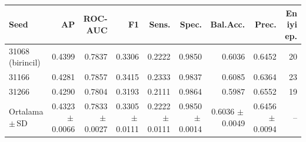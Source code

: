 \begin{tabular}{lrrrrrrrr}\toprule
Seed & AP & ROC-AUC & F1 & Sens. & Spec. & Bal.Acc. & Prec. & En iyi ep. \\\midrule
31068 (birincil) & 0.4399 & 0.7837 & 0.3306 & 0.2222 & 0.9850 & 0.6036 & 0.6452 & 20 \\
31166 & 0.4281 & 0.7857 & 0.3415 & 0.2333 & 0.9837 & 0.6085 & 0.6364 & 23 \\
31266 & 0.4290 & 0.7804 & 0.3193 & 0.2111 & 0.9864 & 0.5987 & 0.6552 & 19 \\
\midrule
Ortalama $\pm$\,SD & 0.4323 $\pm$\,0.0066 & 0.7833 $\pm$\,0.0027 & 0.3305 $\pm$\,0.0111 & 0.2222 $\pm$\,0.0111 & 0.9850 $\pm$\,0.0014 & 0.6036 $\pm$\,0.0049 & 0.6456 $\pm$\,0.0094 & -- \\
\bottomrule\end{tabular}
